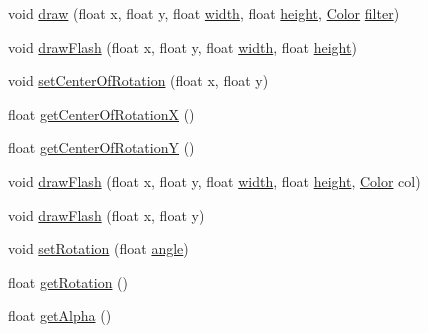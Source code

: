 \begin{DoxyCompactItemize}
void \mbox{\hyperlink{classorg_1_1newdawn_1_1slick_1_1_image_ac12a301582172c0e4073ccfc106ef5d0}{draw}} (float x, float y, float \mbox{\hyperlink{classorg_1_1newdawn_1_1slick_1_1_image_a7d02c85e21b388428cfe5cc5c82714a1}{width}}, float \mbox{\hyperlink{classorg_1_1newdawn_1_1slick_1_1_image_a54397a37823bc59ddc79ec70dc5cf226}{height}}, \mbox{\hyperlink{classorg_1_1newdawn_1_1slick_1_1_color}{Color}} \mbox{\hyperlink{classorg_1_1newdawn_1_1slick_1_1_image_a1c6f09687817420f3762f32bb1c3ed76}{filter}})
\item 
void \mbox{\hyperlink{classorg_1_1newdawn_1_1slick_1_1_image_a5413e23c618b2219effab1115eab40eb}{draw\+Flash}} (float x, float y, float \mbox{\hyperlink{classorg_1_1newdawn_1_1slick_1_1_image_a7d02c85e21b388428cfe5cc5c82714a1}{width}}, float \mbox{\hyperlink{classorg_1_1newdawn_1_1slick_1_1_image_a54397a37823bc59ddc79ec70dc5cf226}{height}})
\item 
void \mbox{\hyperlink{classorg_1_1newdawn_1_1slick_1_1_image_a0619bfcf29c4442f3db4facc917e8677}{set\+Center\+Of\+Rotation}} (float x, float y)
\item 
float \mbox{\hyperlink{classorg_1_1newdawn_1_1slick_1_1_image_a34deedb3a506d7a507e6cc276b5b61d9}{get\+Center\+Of\+RotationX}} ()
\item 
float \mbox{\hyperlink{classorg_1_1newdawn_1_1slick_1_1_image_a198b4dd75a34f47c24b42930d952751a}{get\+Center\+Of\+RotationY}} ()
\item 
void \mbox{\hyperlink{classorg_1_1newdawn_1_1slick_1_1_image_ad450cabca87070b27361277ad0d917a2}{draw\+Flash}} (float x, float y, float \mbox{\hyperlink{classorg_1_1newdawn_1_1slick_1_1_image_a7d02c85e21b388428cfe5cc5c82714a1}{width}}, float \mbox{\hyperlink{classorg_1_1newdawn_1_1slick_1_1_image_a54397a37823bc59ddc79ec70dc5cf226}{height}}, \mbox{\hyperlink{classorg_1_1newdawn_1_1slick_1_1_color}{Color}} col)
\item 
void \mbox{\hyperlink{classorg_1_1newdawn_1_1slick_1_1_image_a3389eeb9c8b27b7a32dab2f51472475f}{draw\+Flash}} (float x, float y)
\item 
void \mbox{\hyperlink{classorg_1_1newdawn_1_1slick_1_1_image_a6c4607d7ab6869b78ef6b81762b6698e}{set\+Rotation}} (float \mbox{\hyperlink{classorg_1_1newdawn_1_1slick_1_1_image_a4076b08a44e95eba2b65075342f16070}{angle}})
\item 
float \mbox{\hyperlink{classorg_1_1newdawn_1_1slick_1_1_image_a6261e57f93955a59ae531403604ff156}{get\+Rotation}} ()
\item 
float \mbox{\hyperlink{classorg_1_1newdawn_1_1slick_1_1_image_a7541ed08232450c948cfc1956d041069}{get\+Alpha}} ()

\end{DoxyCompactItemize}
